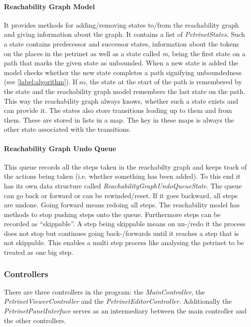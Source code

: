\documentclass[10pt, a4paper]{article}
\begin{document}
\paragraph{Reachability Graph Model} It provides methods for adding/removing states to/from the reachability graph and giving information about the graph. It contains a list of \textit{PetrinetStates}. Such a state contains predecessor and successor states, information about the tokens on the places in the petrinet as well as a state called \textit{m}, being the first state on a path that marks the given state as unbounded. When a new state is added the model checks whether the new state completes a path signifying unboundedness (see \ref{label:algorithm}). If so, the state at the start of the path is remembered by the state and the reachability graph model remembers the last state on the path. This way the reachability graph always knows, whether such a state exists and can provide it. The states also store transitions leading up to them and from them. These are stored in lists in a map. The key in these maps is always the other state associated with the transitions. 

\paragraph{Reachability Graph Undo Queue} This queue records all the steps taken in the reachabilty graph and keeps track of the actions being taken (i.e. whether something has been added). To this end it has its own data structure called \textit{ReachabilityGraphUndoQueueState}. The queue can go back or forward or can be rewinded/reset. If it goes backward, all steps are undone. Going forward means redoing all steps. The reachability model has methods to stop pushing steps onto the queue. Furthermore steps can be recorded as \enquote{skippable}. A step being skippable means on un-/redo it the process does not stop but continues going back-/forwards until it reaches a step that is not skippable. This enables a multi step process like analysing the petrinet to be treated as one big step.  

\subsubsection{Controllers}
There are three controllers in the program: the \textit{MainController}, the \textit{PetrinetViewerController} and the \textit{PetrinetEditorController}. Additionally the \textit{PetrinetPanelInterface} serves as an intermediary between the main controller and the other controllers.
\end{document}
